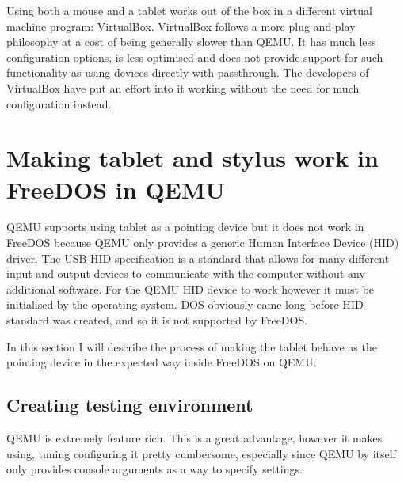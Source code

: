 
Using both a mouse and a tablet works out of the box in a different
virtual machine program: VirtualBox. VirtualBox follows a more plug-and-play
philosophy at a cost of being generally slower than QEMU. It has much less
configuration options, is less optimised and does not provide support for such
functionality as using devices directly with passthrough. The developers of
VirtualBox have put an effort into it working without the need for much
configuration instead.%




\clearpage %

\section{Making tablet and stylus work in FreeDOS in QEMU}


QEMU supports using tablet as a pointing device but it does not work in FreeDOS
because QEMU only provides a generic Human Interface Device (HID) driver.  The
USB-HID specification is a standard that allows for many different input and
output devices to communicate with the computer without any additional software.
For the QEMU HID device to work however it must be initialised by the operating
system.  DOS obviously came long before HID standard was created, and so it is
not supported by FreeDOS.

In this section I will describe the process of making the tablet behave as the
pointing device in the expected way inside FreeDOS on QEMU.

\subsection{Creating testing environment}


QEMU is extremely feature rich.  This is a great advantage, however it makes
using, tuning configuring it pretty cumbersome, especially since QEMU by itself
only provides console arguments as a way to specify settings.

